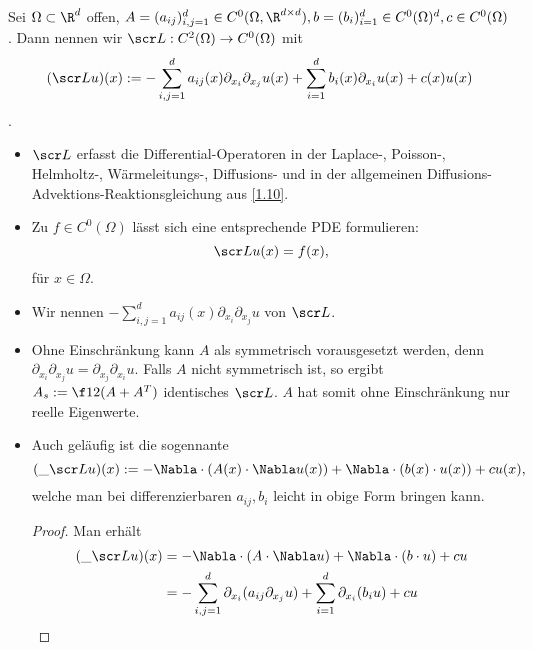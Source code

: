 \begin{df} \label{1.14}
	Sei $\Omega \subset \R^d$ offen, $A = (a_{ij})_{i,j = 1}^d \in C^0 (\Omega, \R^{d\times d}), b = (b_i)_{i=1}^d \in C^0(\Omega)^d, c \in C^0(\Omega)$.
	Dann nennen wir $\scr L: C^2(\Omega) \to C^0(\Omega)$ mit
	\begin{equation} \label{eq:1.2}
		(\scr L u)(x) := - \sum_{i,j=1}^d a_{ij}(x) \partial_{x_i} \partial_{x_j} u(x) + \sum_{i=1}^d b_i(x) \partial_{x_i} u(x) + c(x) u(x)
	\end{equation}
	.
	\begin{note}
		\begin{itemize}
			\item
				$\scr L$ erfasst die Differential-Operatoren in der Laplace-, Poisson-, Helmholtz-, Wärmeleitungs-, Diffusions- und in der allgemeinen Diffusions-Advektions-Reaktionsgleichung aus \ref{1.10}.
			\item
				Zu $f \in C^0(\Omega)$ lässt sich eine entsprechende PDE formulieren:
				\begin{equation} \label{eq:1.3}
					\scr L u(x) = f(x),
				\end{equation}
				für $x \in \Omega$.
			\item
				Wir nennen $-\sum_{i,j=1}^d a_{ij}(x) \partial_{x_i} \partial_{x_j} u$  von $\scr L$.
			\item
				Ohne Einschränkung kann $A$ als symmetrisch vorausgesetzt werden, denn $\partial_{x_i} \partial_{x_j} u = \partial_{x_j} \partial_{x_i} u$.
				Falls $A$ nicht symmetrisch ist, so ergibt $A_s := \f 12 (A + A^T)$ identisches $\scr L$. \Exercise
				$A$ hat somit ohne Einschränkung nur reelle Eigenwerte.
			\item
				Auch geläufig ist die sogennante 
				\[
					(\_{\scr L} u)(x) := -\Nabla \cdot (A(x) \cdot \Nabla u(x)) + \Nabla \cdot (b(x) \cdot u(x)) + cu(x),
				\]
				welche man bei differenzierbaren $a_{ij}, b_i$ leicht in obige Form bringen kann.
				\begin{proof}
					Man erhält
					\begin{align*}
						(\_{\scr L} u)(x) &= - \Nabla \cdot (A \cdot \Nabla u) + \Nabla \cdot (b \cdot u) + c u \\
						&= - \sum_{i,j=1}^d \partial_{x_i} (a_{ij} \partial_{x_j} u) + \sum_{i=1}^d \partial_{x_i} (b_i u) + cu \\

\end{align*}
\end{proof}
\end{itemize}
\end{note}
\end{df}
